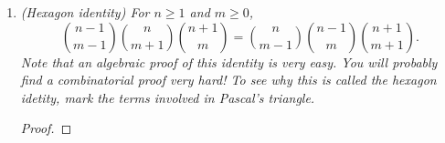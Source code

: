 \documentclass{article}
\begin{document}
\begin{enumerate}[label={\bf Q\arabic*:}]
  \item \it (Hexagon identity) For $n\geq1$ and $m\geq0$,
    \[\binom{n-1}{m-1}\binom{n}{m+1}\binom{n+1}{m}
      =\binom{n}{m-1}\binom{n-1}{m}\binom{n+1}{m+1}.\]
    Note that an algebraic proof of this identity is very easy. You will
    probably find a combinatorial proof very hard! To see why this is
    called the hexagon idetity, mark the terms involved in Pascal's
    triangle.

    \begin{proof}
    \end{proof}
\end{enumerate}
\end{document}

